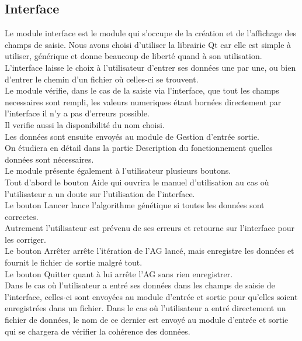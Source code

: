 \documentclass[a4paper,11pt]{article}
\begin{document}
		\subsection{Interface}
			Le module interface est le module qui s’occupe de la création et de l’affichage des champs de saisie. Nous avons choisi d'utiliser la librairie Qt car elle est simple à utiliser, générique et donne beaucoup de liberté quand à son utilisation.\\	
			L’interface laisse le choix à l’utilisateur d’entrer ses données une par une, ou bien d’entrer le chemin  d’un fichier où celles-ci se trouvent.\\
			Le module vérifie, dans le cas de la saisie via l'interface, que tout les champs necessaires sont rempli, les valeurs numeriques étant bornées directement par l'interface il n'y a pas d'erreurs possible.\\
			Il verifie aussi la disponibilité du nom choisi.\\
			Les données sont ensuite envoyés au module de Gestion d'entrée sortie.\\
			On étudiera en détail dans la partie Description du fonctionnement quelles données sont nécessaires.\\

			Le module présente également à l’utilisateur plusieurs boutons.\\
			Tout d’abord le bouton Aide qui ouvrira le manuel d’utilisation au cas où l’utilisateur a un doute sur l’utilisation de l’interface.\\
			Le bouton Lancer lance l’algorithme génétique si toutes les données sont correctes.\\
			Autrement l’utilisateur est prévenu de ses erreurs et retourne sur l’interface pour les corriger.\\
			Le bouton Arrêter arrête l’itération de l’AG lancé, mais enregistre les données et fournit le fichier de sortie malgré tout.\\
			Le bouton Quitter quant à lui arrête l’AG sans rien enregistrer.\\
			Dans le cas où l’utilisateur a entré ses données dans les champs de saisie de l’interface, celles-ci sont envoyées au module d’entrée et sortie pour qu’elles soient enregistrées dans un fichier.
			Dans le cas où l’utilisateur a entré directement un fichier de données, le nom de ce dernier est envoyé au module d’entrée et sortie qui se chargera de vérifier la cohérence des données.\\
	
\end{document}
